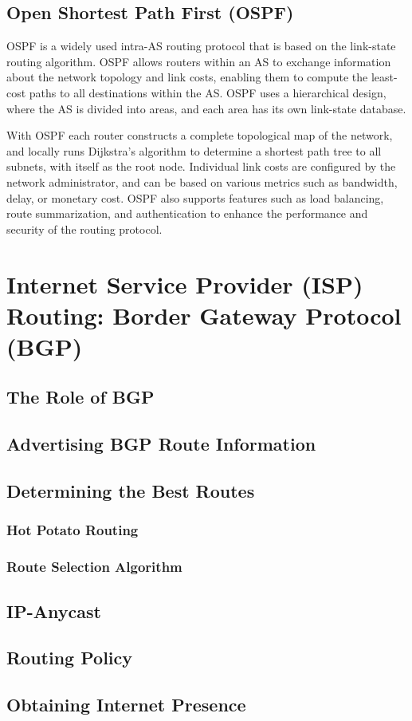 \documentclass[12pt letter]{report}
\begin{document}
\section{Open Shortest Path First (OSPF)}

OSPF is a widely used intra-AS routing protocol that is based on the
link-state routing algorithm. OSPF allows routers within an AS to
exchange information about the network topology and link costs,
enabling them to compute the least-cost paths to all destinations
within the AS. OSPF uses a hierarchical design, where the AS is
divided into areas, and each area has its own link-state database.

With OSPF each router constructs a complete topological map of the
network, and locally runs Dijkstra's algorithm to determine a
shortest path tree to all subnets, with itself as the root node.
Individual link costs are configured by the network administrator,
and can be based on various metrics such as bandwidth, delay, or
monetary cost. OSPF also supports features such as load balancing,
route summarization, and authentication to enhance the performance
and security of the routing protocol.

\chapter{Internet Service Provider (ISP) Routing: Border Gateway
Protocol (BGP)}

\section{The Role of BGP}

\section{Advertising BGP Route Information}

\section{Determining the Best Routes}

\subsection{Hot Potato Routing}

\subsection{Route Selection Algorithm}

\section{IP-Anycast}

\section{Routing Policy}

\section{Obtaining Internet Presence}
\end{document}
